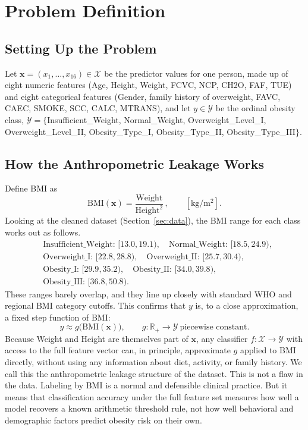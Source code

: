\documentclass[journal]{IEEEtran}
\begin{document}
\section{Problem Definition}
\label{sec:leakage}

\subsection{Setting Up the Problem}
Let $\mathbf{x} = (x_1, \ldots, x_{16}) \in \mathcal{X}$ be the predictor values for one person, made up of eight numeric features (Age, Height, Weight, FCVC, NCP, CH2O, FAF, TUE) and eight categorical features (Gender, family history of overweight, FAVC, CAEC, SMOKE, SCC, CALC, MTRANS), and let $y \in \mathcal{Y}$ be the ordinal obesity class, $\mathcal{Y} = \{$Insufficient\_Weight, Normal\_Weight, Overweight\_Level\_I, Overweight\_Level\_II, Obesity\_Type\_I, Obesity\_Type\_II, Obesity\_Type\_III$\}$.

\subsection{How the Anthropometric Leakage Works}
Define BMI as
\begin{equation}
\mathrm{BMI}(\mathbf{x}) = \frac{\mathrm{Weight}}{\mathrm{Height}^2}\,, \qquad [\mathrm{kg/m^2}].
\label{eq:bmi}
\end{equation}
Looking at the cleaned dataset (Section~\ref{sec:data}), the BMI range for each class works out as follows.
\begin{align}
&\text{Insufficient\_Weight: } [13.0,19.1),\quad \text{Normal\_Weight: } [18.5,24.9), \nonumber\\
&\text{Overweight\_I: } [22.8,28.8),\quad \text{Overweight\_II: } [25.7,30.4), \nonumber\\
&\text{Obesity\_I: } [29.9,35.2),\quad \text{Obesity\_II: } [34.0,39.8), \nonumber\\
&\text{Obesity\_III: } [36.8,50.8). \nonumber
\end{align}
These ranges barely overlap, and they line up closely with standard WHO and regional BMI category cutoffs. This confirms that $y$ is, to a close approximation, a fixed step function of BMI:
\begin{equation}
y \approx g\!\big(\mathrm{BMI}(\mathbf{x})\big), \qquad g:\mathbb{R}_{+}\to\mathcal{Y}\ \text{piecewise constant.}
\label{eq:leakage}
\end{equation}
Because Weight and Height are themselves part of $\mathbf{x}$, any classifier $f: \mathcal{X}\to\mathcal{Y}$ with access to the full feature vector can, in principle, approximate $g$ applied to BMI directly, without using any information about diet, activity, or family history. We call this the anthropometric leakage structure of the dataset. This is not a flaw in the data. Labeling by BMI is a normal and defensible clinical practice. But it means that classification accuracy under the full feature set measures how well a model recovers a known arithmetic threshold rule, not how well behavioral and demographic factors predict obesity risk on their own.
\end{document}
